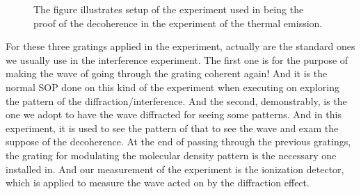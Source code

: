 \documentclass[final,1p,12pt]{elsarticle}
\begin{document}
\begin{figure}
\begin{center}
\end{center}
\caption{The figure illustrates setup of the experiment used in being the proof of the decoherence in the experiment of the thermal emission.}
\label{666}
\end{figure}

For these three gratings applied in the experiment, actually are the standard ones we usually use in the interference experiment. The first one is for the purpose of making the wave of going through the grating coherent again! And it is the normal SOP done on this kind of the experiment when executing on exploring the pattern of the diffraction/interference. And the second, demonstrably, is the one we adopt to have the wave diffracted for seeing some patterns. And in this experiment, it is used to see the pattern of that to see the wave and exam the suppose of the decoherence.  At the end of passing through the previous gratings, the grating for modulating the molecular density pattern is the necessary one installed in. And our measurement of the experiment is the ionization detector, which is applied to measure the wave acted on by the diffraction effect.\\
\end{document}
